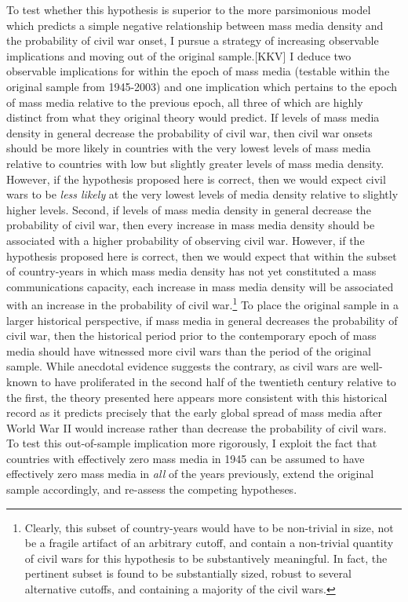 \documentclass[11pt,article,oneside]{memoir}
\begin{document}
To test whether this hypothesis is superior to the more parsimonious
model which predicts a simple negative relationship between mass media
density and the probability of civil war onset, I pursue a strategy of
increasing observable implications and moving out of the original
sample.{[}KKV{]} I deduce two observable implications for within the
epoch of mass media (testable within the original sample from 1945-2003)
and one implication which pertains to the epoch of mass media relative
to the previous epoch, all three of which are highly distinct from what
they original theory would predict. If levels of mass media density in
general decrease the probability of civil war, then civil war onsets
should be more likely in countries with the very lowest levels of mass
media relative to countries with low but slightly greater levels of mass
media density. However, if the hypothesis proposed here is correct, then
we would expect civil wars to be \emph{less likely} at the very lowest
levels of media density relative to slightly higher levels. Second, if
levels of mass media density in general decrease the probability of
civil war, then every increase in mass media density should be
associated with a higher probability of observing civil war. However, if
the hypothesis proposed here is correct, then we would expect that
within the subset of country-years in which mass media density has not
yet constituted a mass communications capacity, each increase in mass
media density will be associated with an increase in the probability of
civil war.\footnote{Clearly, this subset of country-years would have to
  be non-trivial in size, not be a fragile artifact of an arbitrary
  cutoff, and contain a non-trivial quantity of civil wars for this
  hypothesis to be substantively meaningful. In fact, the pertinent
  subset is found to be substantially sized, robust to several
  alternative cutoffs, and containing a majority of the civil wars.} To
place the original sample in a larger historical perspective, if mass
media in general decreases the probability of civil war, then the
historical period prior to the contemporary epoch of mass media should
have witnessed more civil wars than the period of the original sample.
While anecdotal evidence suggests the contrary, as civil wars are
well-known to have proliferated in the second half of the twentieth
century relative to the first, the theory presented here appears more
consistent with this historical record as it predicts precisely that the
early global spread of mass media after World War II would increase
rather than decrease the probability of civil wars. To test this
out-of-sample implication more rigorously, I exploit the fact that
countries with effectively zero mass media in 1945 can be assumed to
have effectively zero mass media in \emph{all} of the years previously,
extend the original sample accordingly, and re-assess the competing
hypotheses.
\end{document}

